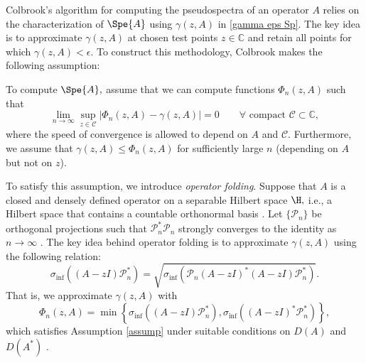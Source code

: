 Colbrook's algorithm for computing the pseudospectra of an operator $A$ relies on the characterization of $\Spe{A}$ using $\gamma(z,A)$ in \eqref{gamma eps Sp}. The key idea is to approximate $\gamma(z, A)$ at chosen test points $z \in \mathbb{C}$ and retain all points for which $\gamma(z, A) < \epsilon.$ To construct this methodology, Colbrook makes the following assumption:
\begin{assumption}\label{assump}
    To compute $\Spe{A},$ assume that we can compute functions $\Phi_n(z, A)$ such that 
    \begin{equation}
        \lim_{n \rightarrow \infty} \sup_{z \in \mathcal{C}} | \Phi_n(z, A) - \gamma(z, A) | = 0 \qquad \forall \text{ compact } \mathcal{C} \subset \mathbb{C}, 
    \end{equation}
    where the speed of convergence is allowed to depend on $A$ and $\mathcal{C}.$ Furthermore, we assume that $\gamma(z, A) \le \Phi_n(z, A)$ for sufficiently large $n$ (depending on $A$ but not on $z$).
\end{assumption}

To satisfy this assumption, we introduce \textit{operator folding}. Suppose that $A$ is a closed and densely defined operator on a separable Hilbert space $\H,$ i.e., a Hilbert space that contains a countable orthonormal basis \cite{Matt}. Let $\{\mathcal{P}_n\}$ be orthogonal projections such that $\mathcal{P}_n^*\mathcal{P}_n$ strongly converges to the identity as $n \rightarrow \infty$ \cite{Matt}. The key idea behind operator folding is to approximate $\gamma(z, A)$ using the following relation:
\begin{equation}
    \sigma_{\inf}((A-zI)\mathcal{P}_n^*) =  \sqrt{\sigma_{\inf}(\mathcal{P}_n(A-zI)^*(A-zI)\mathcal{P}_n^*)}.
\end{equation}
That is, we approximate $\gamma(z, A)$ with 
\begin{equation} \label{phi Pn}
    \Phi_n(z, A) = \min \left\{\sigma_{\inf}((A-zI) \mathcal{P}_n^*), \sigma_{\inf}((A-zI)^*\mathcal{P}_n^*) \right\},
\end{equation}
which satisfies Assumption \ref{assump} under suitable conditions on $D(A)$ and $D(A^*)$ \cite{Matt, kato}. 

